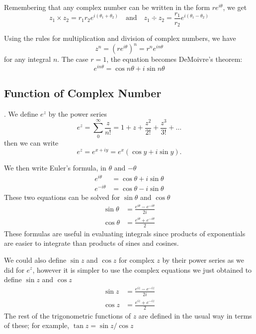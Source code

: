 \documentclass[../main.tex]{subfiles}
\begin{document}
Remembering that any complex number can be written in the form $re^{i\theta}$, we get
\begin{equation*}
    z_1\times z_2=r_1r_2e^{i(\theta_1+\theta_2)}\quad\text{and}\quad z_1\div z_2=\frac{r_1}{r_2}e^{i(\theta_1-\theta_2)}
\end{equation*}

Using the rules for multiplication and division of complex numbers, we have
\begin{equation*}
    z^n = (re^{i\theta})^n = r^ne^{in\theta}
\end{equation*}
for any integral $n$.  The case $r = 1$, the equation becomes DeMoivre's theorem:
\begin{equation*}
    e^{in\theta}=\cos n\theta + i \sin n\theta
\end{equation*}

\subsection*{Function of Complex Number}. We define $e^z$ by the power series
\begin{equation*}
    e^z=\sum_{0}^{\infty}\frac{z}{n!}=1+z+\frac{z^2}{2!}+\frac{z^3}{3!}+\dots
\end{equation*}
then we can write 
\begin{equation*}
    e^z=e^{x+iy}  = e^x(\cos y + i \sin y).
\end{equation*}

We then write Euler's formula, in $\theta$ and $-\theta$
\begin{align*}
    e^{i\theta}&=\cos\theta+i\sin\theta\\
    e^{-i\theta}&=\cos\theta-i\sin\theta
\end{align*}
These two equations can be solved for $\sin\theta$ and $\cos\theta$
\begin{align*}
    \sin \theta&=\frac{e^{i\theta}-e^{-i\theta}}{2i}\\
    \cos \theta&=\frac{e^{i\theta}+e^{-i\theta}}{2}
\end{align*}
These formulas are useful in evaluating integrals since products of exponentials are 
easier to integrate than products of sines and cosines. 

We could also deﬁne $\sin z$ and $\cos z$ for complex $z$ by their power series as we did for $e^z$, however it is simpler to use the complex equations we just obtained to define  $\sin z$ and $\cos z$
\begin{align*}
    \sin z&=\frac{e^{iz}-e^{-iz}}{2i}\\
    \cos z&=\frac{e^{iz}+e^{-iz}}{2}
\end{align*}
The rest of the trigonometric functions of $z$ are deﬁned in the usual way in terms of these; for example, $\tan z = \sin z/ \cos z$
\end{document}
